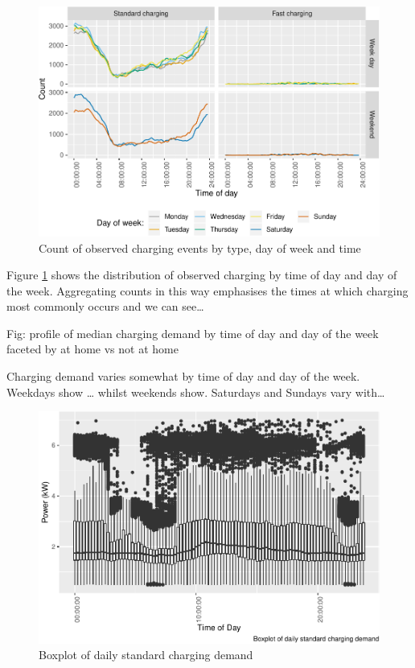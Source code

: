 \documentclass[]{article}
\begin{document}
\begin{figure}
\centering
\includegraphics{EVBB_SummaryReport_files/figure-latex/chargeTime-1.pdf}
\caption{\label{fig:chargeTime}Count of observed charging events by type,
day of week and time}
\end{figure}

Figure \ref{fig:chargeTime} shows the distribution of observed charging
by time of day and day of the week. Aggregating counts in this way
emphasises the times at which charging most commonly occurs and we can
see\ldots{}

Fig: profile of median charging demand by time of day and day of the
week faceted by at home vs not at home

Charging demand varies somewhat by time of day and day of the week.
Weekdays show \ldots{} whilst weekends show. Saturdays and Sundays vary
with\ldots{}

\begin{figure}
\centering
\includegraphics{EVBB_SummaryReport_files/figure-latex/boxplotCharging-1.pdf}
\caption{\label{fig:boxplotCharging}Boxplot of daily standard charging
demand}
\end{figure}
\end{document}
